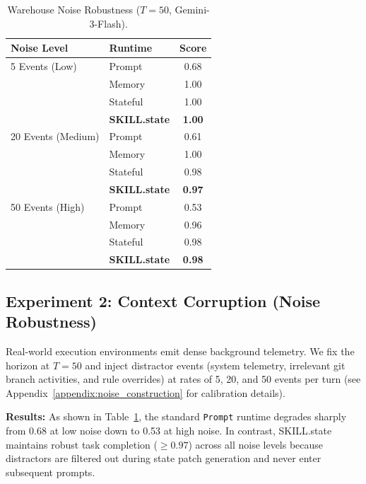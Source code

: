 \documentclass[11pt]{article}
\begin{document}
\begin{table}[h]
\centering
\small
\caption{Warehouse Noise Robustness ($T=50$, Gemini-3-Flash).}
\label{tab:env1_exp2_noise}
\begin{tabular*}{\columnwidth}{@{\extracolsep{\fill}}llc@{}}
\toprule
\textbf{Noise Level} & \textbf{Runtime} & \textbf{Score} \\
\midrule
5 Events (Low) & Prompt & 0.68 \\
& Memory & 1.00 \\
& Stateful & 1.00 \\
& \textbf{SKILL.state} & \textbf{1.00} \\
\midrule
20 Events (Medium) & Prompt & 0.61 \\
& Memory & 1.00 \\
& Stateful & 0.98 \\
& \textbf{SKILL.state} & \textbf{0.97} \\
\midrule
50 Events (High) & Prompt & 0.53 \\
& Memory & 0.96 \\
& Stateful & 0.98 \\
& \textbf{SKILL.state} & \textbf{0.98} \\
\bottomrule
\end{tabular*}
\end{table}

\subsection{Experiment 2: Context Corruption (Noise Robustness)}
\label{subsec:exp2_noise}

Real-world execution environments emit dense background telemetry. We fix the horizon at $T=50$ and inject distractor events (system telemetry, irrelevant git branch activities, and rule overrides) at rates of 5, 20, and 50 events per turn (see Appendix~\ref{appendix:noise_construction} for calibration details).

\noindent\textbf{Results:} As shown in Table~\ref{tab:env1_exp2_noise}, the standard \texttt{Prompt} runtime degrades sharply from 0.68 at low noise down to 0.53 at high noise. In contrast, SKILL.state maintains robust task completion ($\ge 0.97$) across all noise levels because distractors are filtered out during state patch generation and never enter subsequent prompts.
\end{document}

